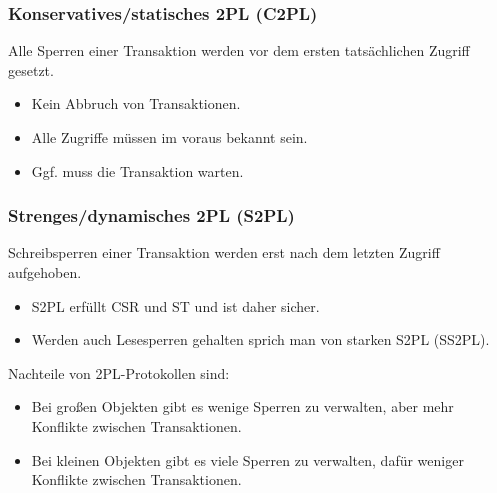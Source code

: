 \documentclass[a4paper,parskip=half*,DIV=15,fontsize=11pt]{scrartcl}
\begin{document}
\begin{minipage}[t]{0.45\textwidth}
\subsubsection*{Konservatives/statisches 2PL (C2PL)}
Alle Sperren einer Transaktion werden vor dem ersten tatsächlichen Zugriff gesetzt.
\begin{itemize}
\item Kein Abbruch von Transaktionen.
\item Alle Zugriffe müssen im voraus bekannt sein.
\item Ggf. muss die Transaktion warten.
\end{itemize}
\end{minipage}
\hspace{0.1\textwidth}
\begin{minipage}[t]{0.45\textwidth}
\subsubsection*{Strenges/dynamisches 2PL (S2PL)}
Schreibsperren einer Transaktion werden erst nach dem letzten Zugriff aufgehoben.
\begin{itemize}
\item S2PL erfüllt CSR und ST und ist daher sicher.
\item Werden auch Lesesperren gehalten sprich man von starken S2PL (SS2PL).
\end{itemize}
\end{minipage}

Nachteile von 2PL-Protokollen sind:
\begin{itemize}
\item Bei großen Objekten gibt es wenige Sperren zu verwalten, aber mehr Konflikte zwischen Transaktionen.
\item Bei kleinen Objekten gibt es viele Sperren zu verwalten, dafür weniger Konflikte zwischen Transaktionen.
\end{itemize}
\end{document}
